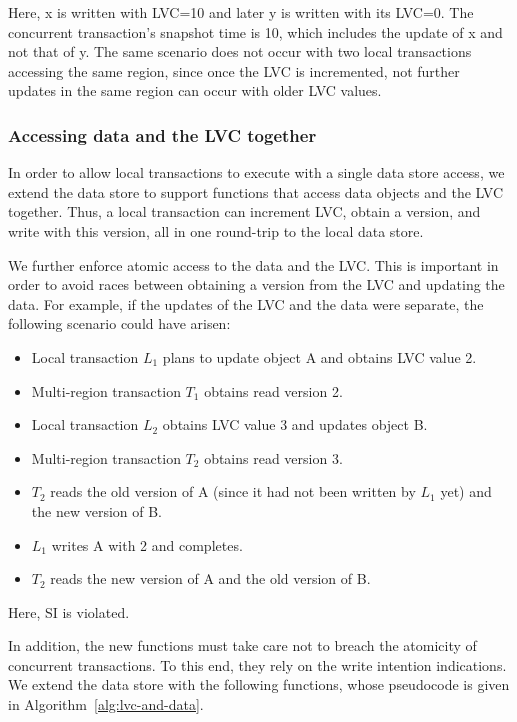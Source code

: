 Here, x is written with LVC=10 and later y is written with its LVC=0. The
concurrent transaction's snapshot time is 10, which includes the update of x and
not that of y. The same scenario does not occur with two local transactions
accessing the same region, since once the LVC is incremented, not further
updates in the same region can occur with older LVC values.



\subsubsection{Accessing data and the LVC together} \label{ssec:lvc-access}

In order to allow local transactions to execute with a single data store access,
we extend the data store to support functions that access data objects and the
LVC together. Thus, a local transaction can increment LVC, obtain a version, and
write with this version, all in one round-trip to the local data store.

We further enforce atomic access to the data and the LVC. This is important in
order to avoid races between obtaining a version from the LVC and updating the
data. For example, if the updates of the LVC and the data were separate, the
following scenario could have arisen:
\begin{itemize}
  \item Local transaction $L_1$ plans to update object A and obtains LVC value 2.
  \item Multi-region transaction $T_1$ obtains read version 2.
  \item Local transaction $L_2$ obtains LVC value 3 and updates object B.
  \item Multi-region transaction $T_2$ obtains read version 3.
  \item $T_2$ reads the old version of A (since it had not been written by $L_1$ yet)
  and the new version of  B.
  \item $L_1$ writes A with 2 and completes.
  \item $T_2$ reads the new version of A and the old version of  B.
\end{itemize}
Here, SI is violated.

In addition, the new functions must take care not to breach the  atomicity of
concurrent transactions. To this end, they rely on the write intention indications.
We extend the data store with the following functions, whose 
pseudocode is given in Algorithm~\ref{alg:lvc-and-data}. 

